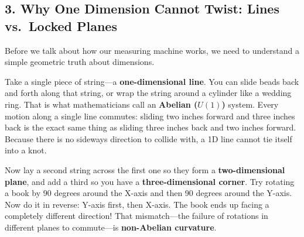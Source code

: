 \documentclass[11pt,a4paper]{article}
\begin{document}
\subsection*{3. Why One Dimension Cannot Twist: Lines vs.\ Locked Planes}

Before we talk about how our measuring machine works, we need to understand a simple geometric truth about dimensions.

Take a single piece of string---a \textbf{one-dimensional line}. You can slide beads back and forth along that string, or wrap the string around a cylinder like a wedding ring. That is what mathematicians call an \textbf{Abelian ($U(1)$)} system. Every motion along a single line commutes: sliding two inches forward and three inches back is the exact same thing as sliding three inches back and two inches forward. Because there is no sideways direction to collide with, a 1D line cannot tie itself into a knot.

Now lay a second string across the first one so they form a \textbf{two-dimensional plane}, and add a third so you have a \textbf{three-dimensional corner}. Try rotating a book by 90 degrees around the X-axis and then 90 degrees around the Y-axis. Now do it in reverse: Y-axis first, then X-axis. The book ends up facing a completely different direction! That mismatch---the failure of rotations in different planes to commute---is \textbf{non-Abelian curvature}.
\end{document}
